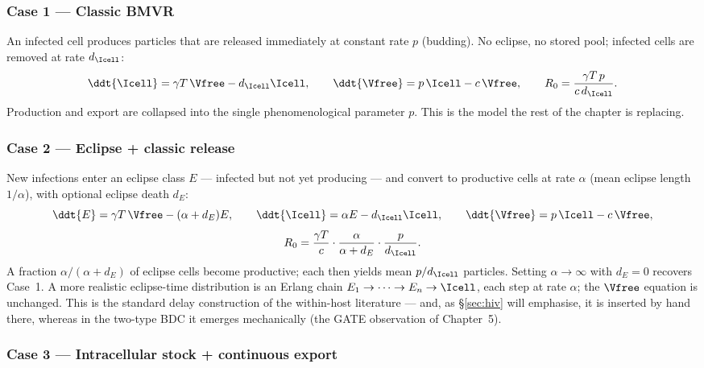 \subsubsection{Case 1 --- Classic BMVR}

An infected cell produces particles that are released immediately at
constant rate $p$ (budding). No eclipse, no stored pool; infected cells are
removed at rate $d_{\Icell}$:
\begin{equation}
\ddt{\Icell}=\gamma T\,\Vfree-d_{\Icell}\Icell,
\qquad
\ddt{\Vfree}=p\,\Icell-c\,\Vfree,
\qquad
R_0=\frac{\gamma T\,p}{c\,d_{\Icell}}.
\end{equation}
Production and export are collapsed into the single phenomenological
parameter $p$. This is the model the rest of the chapter is replacing.

\subsubsection{Case 2 --- Eclipse + classic release}

New infections enter an eclipse class $E$ --- infected but not yet
producing --- and convert to productive cells at rate $\alpha$ (mean
eclipse length $1/\alpha$), with optional eclipse death $d_E$:
\begin{equation}
\ddt{E}=\gamma T\,\Vfree-(\alpha+d_E)E,
\qquad
\ddt{\Icell}=\alpha E-d_{\Icell}\Icell,
\qquad
\ddt{\Vfree}=p\,\Icell-c\,\Vfree,
\end{equation}
\begin{equation}
R_0=\frac{\gamma T}{c}\cdot\frac{\alpha}{\alpha+d_E}\cdot\frac{p}{d_{\Icell}}.
\end{equation}
A fraction $\alpha/(\alpha+d_E)$ of eclipse cells become productive; each
then yields mean $p/d_{\Icell}$ particles. Setting $\alpha\to\infty$ with
$d_E=0$ recovers Case~1. A more realistic eclipse-time distribution is an
Erlang chain $E_1\to\cdots\to E_n\to\Icell$, each step at rate $\alpha$;
the $\Vfree$ equation is unchanged. This is the standard delay construction
of the within-host literature --- and, as \S\ref{sec:hiv} will emphasise,
it is inserted by hand there, whereas in the two-type BDC it emerges
mechanically (the GATE observation of Chapter~5).

\subsubsection{Case 3 --- Intracellular stock + continuous export}


